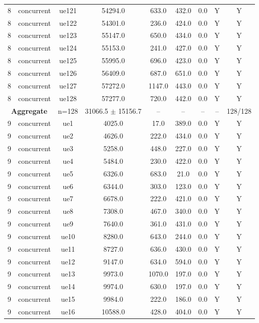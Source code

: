 \begin{table}[ht]
\begin{tabular}{|c|c|c|c|c|c|c|c|c|}
8 & concurrent & ue121 & 54294.0 & 633.0 & 432.0 & 0.0 & Y & Y \\
8 & concurrent & ue122 & 54301.0 & 236.0 & 424.0 & 0.0 & Y & Y \\
8 & concurrent & ue123 & 55147.0 & 650.0 & 434.0 & 0.0 & Y & Y \\
8 & concurrent & ue124 & 55153.0 & 241.0 & 427.0 & 0.0 & Y & Y \\
8 & concurrent & ue125 & 55995.0 & 696.0 & 423.0 & 0.0 & Y & Y \\
8 & concurrent & ue126 & 56409.0 & 687.0 & 651.0 & 0.0 & Y & Y \\
8 & concurrent & ue127 & 57272.0 & 1147.0 & 443.0 & 0.0 & Y & Y \\
8 & concurrent & ue128 & 57277.0 & 720.0 & 442.0 & 0.0 & Y & Y \\
\multicolumn{2}{|c|}{\textbf{Aggregate}} & n=128 & 31066.5 $\pm$ 15156.7 & -- & -- & -- & -- & 128/128 \\
\hline
9 & concurrent & ue1 & 4025.0 & 17.0 & 389.0 & 0.0 & Y & Y \\
9 & concurrent & ue2 & 4626.0 & 222.0 & 434.0 & 0.0 & Y & Y \\
9 & concurrent & ue3 & 5258.0 & 448.0 & 227.0 & 0.0 & Y & Y \\
9 & concurrent & ue4 & 5484.0 & 230.0 & 422.0 & 0.0 & Y & Y \\
9 & concurrent & ue5 & 6326.0 & 683.0 & 21.0 & 0.0 & Y & Y \\
9 & concurrent & ue6 & 6344.0 & 303.0 & 123.0 & 0.0 & Y & Y \\
9 & concurrent & ue7 & 6678.0 & 222.0 & 421.0 & 0.0 & Y & Y \\
9 & concurrent & ue8 & 7308.0 & 467.0 & 340.0 & 0.0 & Y & Y \\
9 & concurrent & ue9 & 7640.0 & 361.0 & 431.0 & 0.0 & Y & Y \\
9 & concurrent & ue10 & 8280.0 & 643.0 & 244.0 & 0.0 & Y & Y \\
9 & concurrent & ue11 & 8727.0 & 636.0 & 430.0 & 0.0 & Y & Y \\
9 & concurrent & ue12 & 9147.0 & 634.0 & 594.0 & 0.0 & Y & Y \\
9 & concurrent & ue13 & 9973.0 & 1070.0 & 197.0 & 0.0 & Y & Y \\
9 & concurrent & ue14 & 9974.0 & 630.0 & 197.0 & 0.0 & Y & Y \\
9 & concurrent & ue15 & 9984.0 & 222.0 & 186.0 & 0.0 & Y & Y \\
9 & concurrent & ue16 & 10588.0 & 428.0 & 404.0 & 0.0 & Y & Y \\

\end{tabular}
\end{table}
